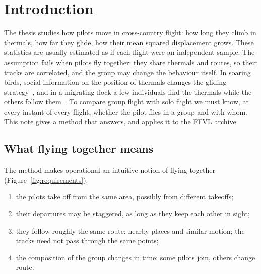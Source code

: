 \section{Introduction}\label{sec:intro}\label{sec:motivation}

The thesis studies how pilots move in cross-country flight: how long they climb in thermals, how
far they glide, how their mean squared displacement grows. These statistics are usually estimated
as if each flight were an independent sample. The assumption fails when pilots fly together: they
share thermals and routes, so their tracks are correlated, and the group may change the behaviour
itself. In soaring birds, social information on the position of thermals changes the gliding
strategy~\cite{williams2018}, and in a migrating flock a few individuals find the thermals while
the others follow them~\cite{flack2018,nagy2018}. To compare group flight with solo flight we must
know, at every instant of every flight, whether the pilot flies in a group and with whom. This
note gives a method that answers, and applies it to the FFVL archive.

\subsection{What flying together means}

The method makes operational an intuitive notion of flying together
(Figure~\ref{fig:requirements}):
\begin{enumerate}[label=(R\arabic*), leftmargin=3.2em]
  \item the pilots take off from the same area, possibly from different takeoffs;
  \item their departures may be staggered, as long as they keep each other in sight;
  \item they follow roughly the same route: nearby places and similar motion; the tracks need
        not pass through the same points;
  \item the composition of the group changes in time: some pilots join, others change route.
\end{enumerate}

